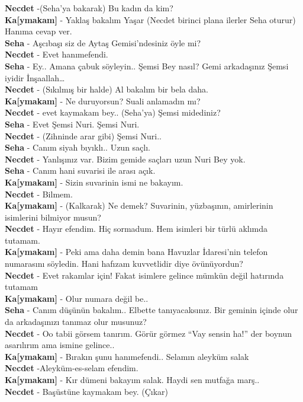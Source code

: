 \documentclass[]{book}
\begin{document}
\textbf{Necdet} -(Seha'ya bakarak) Bu kadın da kim?\\
\textbf{Ka{[}ymakam{]}} - Yaklaş bakalım Yaşar (Necdet birinci plana ilerler Seha oturur) Hanıma cevap ver.\\
\textbf{Seha} - Aşcıbaşı siz de Aytaş Gemisi'ndesiniz öyle mi?\\
\textbf{Necdet} - Evet hanımefendi.\\
\textbf{Seha} - Ey.. Amana çabuk söyleyin.. Şemsi Bey nasıl? Gemi arkadaşınız Şemsi iyidir İnşaallah\ldots{}\\
\textbf{Necdet} - (Sıkılmış bir halde) Al bakalım bir bela daha.\\
\textbf{Ka{[}ymakam{]}} - Ne duruyorsun? Suali anlamadın mı?\\
\textbf{Necdet} - evet kaymakam bey.. (Seha'ya) Şemsi midediniz?\\
\textbf{Seha} - Evet Şemsi Nuri. Şemsi Nuri.\\
\textbf{Necdet} - (Zihninde arar gibi) Şemsi Nuri..\\
\textbf{Seha} - Canım siyah bıyıklı.. Uzun saçlı.\\
\textbf{Necdet} - Yanlışınız var. Bizim gemide saçları uzun Nuri Bey yok.\\
\textbf{Seha} - Canım hani suvarisi ile arası açık.\\
\textbf{Ka{[}ymakam{]}} - Sizin suvarinin ismi ne bakayım.\\
\textbf{Necdet} - Bilmem.\\
\textbf{Ka{[}ymakam{]}} - (Kalkarak) Ne demek? Suvarinin, yüzbaşının, amirlerinin isimlerini bilmiyor musun?\\
\textbf{Necdet} - Hayır efendim. Hiç sormadum. Hem isimleri bir türlü aklımda tutamam.\\
\textbf{Ka{[}ymakam{]}} - Peki ama daha demin bana Havuzlar İdaresi'nin telefon numarasını söyledin. Hani hafızam kuvvetlidir diye övünüyordun?\\
\textbf{Necdet} - Evet rakamlar için! Fakat isimlere gelince mümkün değil hatırında tutamam\\
\textbf{Ka{[}ymakam{]}} - Olur numara değil be..\\
\textbf{Seha} - Canım düşünün bakalım.. Elbette tanıyacaksınız. Bir geminin içinde olur da arkadaşınızı tanımaz olur musunuz?\\
\textbf{Necdet} - Oo tabii görsem tanırım. Görür görmez ``Vay sensin ha!'' der boynun asarılırım ama ismine gelince..\\
\textbf{Ka{[}ymakam{]}} - Bırakın şunu hanımefendi.. Selamın aleyküm salak\\
\textbf{Necdet} -Aleyküm-es-selam efendim.\\
\textbf{Ka{[}ymakam{]}} - Kır dümeni bakayım salak. Haydi sen mutfağa marş..\\
\textbf{Necdet} - Başüstüne kaymakam bey. (Çıkar)\\
\end{document}
